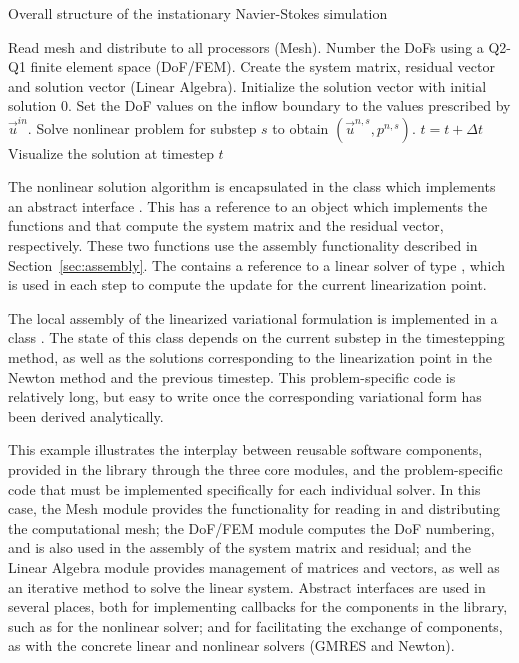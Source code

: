 \begin{algorithm}
  \caption{Overall structure of the instationary Navier-Stokes simulation}
  \label{algo:inst_ns}
  \begin{algorithmic}
    \State Read mesh and distribute to all processors (Mesh).
    \State Number the DoFs using a Q2-Q1 finite element space (DoF/FEM).
    \State Create the system matrix, residual vector and solution vector (Linear Algebra).
    \State Initialize the solution vector with initial solution 0.
    \State Set the DoF values on the inflow boundary to the values prescribed by $\vec{u}^{in}$.
        \State Solve nonlinear problem for substep $s$ to obtain $\left(\vec{u}^{n,s}, p^{n,s}\right)$.
      \EndFor
    \State $t = t + \Delta{}t$
    \State Visualize the solution at timestep $t$
    \EndWhile
    \EndFunction
  \end{algorithmic}
\end{algorithm}
%
The nonlinear solution algorithm is encapsulated in the class
 which implements an abstract interface
. This has a reference to an object which
implements the functions  and  that
compute the system matrix and the residual vector, respectively. These
two functions use the assembly functionality described in
Section~\ref{sec:assembly}. The  contains a
reference to a linear solver of type , which is used in each step to compute
the update for the current linearization point.

The local assembly of the linearized variational formulation is
implemented in a class . The state of
this class depends on the current substep in the timestepping method,
as well as the solutions corresponding to the linearization point in
the Newton method and the previous timestep. This problem-specific
code is relatively long, but easy to write once the corresponding
variational form has been derived analytically.

This example illustrates the interplay between reusable software
components, provided in the \hiflow{} library through the three core 
modules, and the problem-specific code that must be implemented
specifically for each individual solver. In this case, the Mesh module
provides the functionality for reading in and distributing the
computational mesh; the DoF/FEM module computes the DoF numbering, and
is also used in the assembly of the system matrix and residual; and
the Linear Algebra module provides management of matrices and vectors,
as well as an iterative method to solve the linear system. Abstract
interfaces are used in several places, both for implementing callbacks
for the components in the library, such as for the nonlinear solver;
and for facilitating the exchange of components, as with the
concrete linear and nonlinear solvers (GMRES and Newton).


